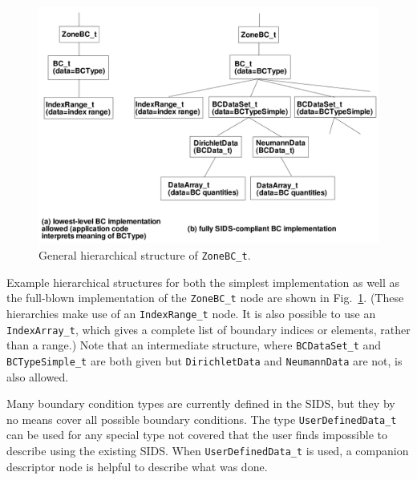 \documentclass[12pt]{article}
\begin{document}
\begin{figure}[hpbt]
\centerline{{\includegraphics[width=150mm]{figures/bc}}}
\caption{General hierarchical structure of {\tt ZoneBC\_t}.}
\label{FIGbc}
\end{figure}
%

Example hierarchical structures for both the simplest 
implementation as well as the full-blown implementation
of the {\tt ZoneBC\_t} node are shown in Fig.~\ref{FIGbc}.  (These
hierarchies make use of an {\tt IndexRange\_t} node.  It is
also possible to use an {\tt IndexArray\_t}, which
gives a complete list of boundary indices or elements, rather than a
range.)  Note that an intermediate structure, where {\tt BCDataSet\_t} and
{\tt BCTypeSimple\_t} are both given but {\tt DirichletData} and
{\tt NeumannData} are not, is also allowed.

Many boundary condition types are currently defined in the SIDS,
but they by no means cover all possible boundary conditions.
The type {\tt UserDefinedData\_t} can be used for any special type not covered
that the user finds impossible to describe using the existing
SIDS.  When {\tt UserDefinedData\_t} is used,
a companion descriptor node is helpful to describe what was done.

~

\end{document}
